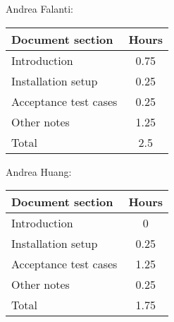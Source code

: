 Andrea Falanti:

\begin{tabular}{|l|c|}
    \hline
    Document section & Hours\\
    \hline
     Introduction & 0.75\\
     Installation setup & 0.25\\
     Acceptance test cases & 0.25\\
     Other notes & 1.25\\
     \hline
     Total & 2.5\\
     \hline
\end{tabular}

\vskip 0.3in

Andrea Huang:

\begin{tabular}{|l|c|}
    \hline
    Document section & Hours \\
    \hline
     Introduction & 0\\
     Installation setup & 0.25\\
     Acceptance test cases & 1.25\\
     Other notes & 0.25\\
     \hline
     Total & 1.75\\
     \hline
\end{tabular}